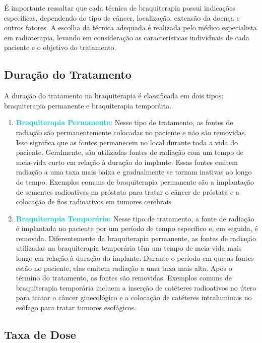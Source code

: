 \documentclass[11pt,a4paper]{article}
\begin{document}
	É importante ressaltar que cada técnica de braquiterapia possui indicações específicas, dependendo do tipo de câncer, localização, extensão da doença e outros fatores. A escolha da técnica adequada é realizada pelo médico especialista em radioterapia, levando em consideração as características individuais de cada paciente e o objetivo do tratamento.

\subsection{Duração do Tratamento}

	A duração do tratamento na braquiterapia é classificada em dois tipos: braquiterapia permanente e braquiterapia temporária.

	\begin{enumerate}

		\item \textcolor{DarkTurquoise}{\textbf{Braquiterapia Permanente:}}  Nesse tipo de tratamento, as fontes de radiação são permanentemente colocadas no paciente e não são removidas. Isso significa que as fontes permanecem no local durante toda a vida do paciente. Geralmente, são utilizadas fontes de radiação com um tempo de meia-vida curto em relação à duração do implante. Essas fontes emitem radiação a uma taxa mais baixa e gradualmente se tornam inativas ao longo do tempo. Exemplos comuns de braquiterapia permanente são a implantação de sementes radioativas na próstata para tratar o câncer de próstata e a colocação de fios radioativos em tumores cerebrais.
		
		\item \textcolor{DarkTurquoise}{\textbf{Braquiterapia Temporária:}} Nesse tipo de tratamento, a fonte de radiação é implantada no paciente por um período de tempo específico e, em seguida, é removida. Diferentemente da braquiterapia permanente, as fontes de radiação utilizadas na braquiterapia temporária têm um tempo de meia-vida mais longo em relação à duração do implante. Durante o período em que as fontes estão no paciente, elas emitem radiação a uma taxa mais alta. Após o término do tratamento, as fontes são removidas. Exemplos comuns de braquiterapia temporária incluem a inserção de catéteres radioativos no útero para tratar o câncer ginecológico e a colocação de catéteres intraluminais no esôfago para tratar tumores esofágicos.
		
	\end{enumerate}		

\subsection{Taxa de Dose}
\end{document}
